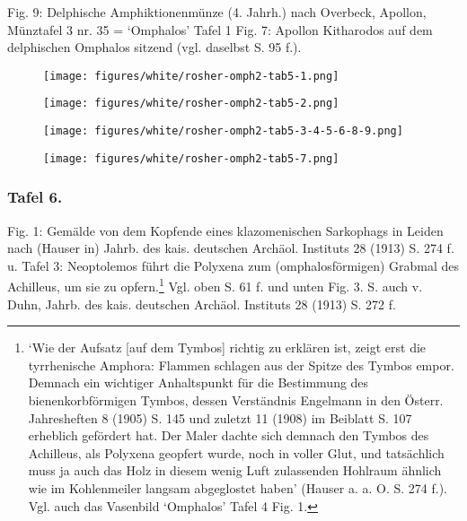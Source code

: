 \documentclass[a4paper, 11pt, oneside]{article}
\begin{document}
Fig. 9: Delphische Amphiktionenmünze (4. Jahrh.) nach Overbeck, Apollon, Münztafel 3 nr. 35 = `Omphalos' Tafel 1 Fig. 7: Apollon Kitharodos auf dem delphischen Omphalos sitzend (vgl. daselbst S. 95 f.).
\clearpage
\vspace*{\fill}
\begin{figure}[H]
\centering
\texttt{[image: figures/white/rosher-omph2-tab5-1.png]}
\caption{}
\end{figure}
\vspace*{\fill}
\clearpage
\vspace*{\fill}
\begin{figure}[H]
\centering
\texttt{[image: figures/white/rosher-omph2-tab5-2.png]}
\caption{}
\end{figure}
\vspace*{\fill}
\clearpage
\vspace*{\fill}
\begin{figure}[H]
\centering
\texttt{[image: figures/white/rosher-omph2-tab5-3-4-5-6-8-9.png]}
\caption{}
\end{figure}
\vspace*{\fill}
\clearpage
\vspace*{\fill}
\begin{figure}[H]
\centering
\texttt{[image: figures/white/rosher-omph2-tab5-7.png]}
\caption{}
\end{figure}
\vspace*{\fill}
\clearpage
\subsubsection{Tafel 6.}

Fig. 1: Gemälde von dem Kopfende eines klazomenischen Sarkophags in Leiden nach (Hauser in) Jahrb. des kais. deutschen Archäol. Instituts 28 (1913) S. 274 f. u. Tafel 3: Neoptolemos führt die Polyxena zum (omphalosförmigen) Grabmal des Achilleus, um sie zu opfern.\footnote{`Wie der Aufsatz [auf dem Tymbos] richtig zu erklären ist, zeigt erst die tyrrhenische Amphora: Flammen schlagen aus der Spitze des Tymbos empor. Demnach ein wichtiger Anhaltspunkt für die Bestimmung des bienenkorbförmigen Tymbos, dessen Verständnis Engelmann in den Österr. Jahresheften 8 (1905) S. 145 und zuletzt 11 (1908) im Beiblatt S. 107 erheblich gefördert hat. Der Maler dachte sich demnach den Tymbos des Achilleus, als Polyxena geopfert wurde, noch in voller Glut, und tatsächlich muss ja auch das Holz in diesem wenig Luft zulassenden Hohlraum ähnlich wie im Kohlenmeiler langsam abgeglostet haben' (Hauser a. a. O. S. 274 f.). Vgl. auch das Vasenbild `Omphalos' Tafel 4 Fig. 1.} Vgl. oben S. 61 f. und unten Fig. 3. S. auch v. Duhn, Jahrb. des kais. deutschen Archäol. Instituts 28 (1913) S. 272 f.
\end{document}
